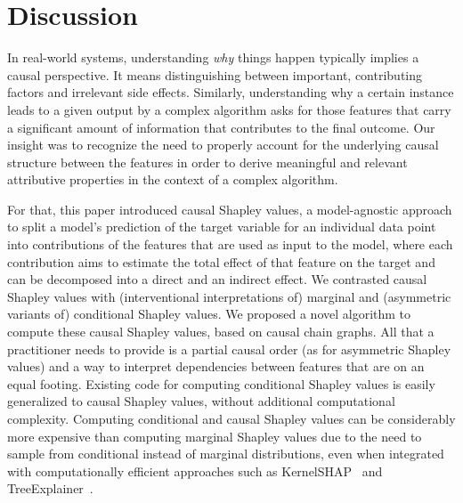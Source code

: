 \documentclass{article}
\newcommand{\comment}[1]{{\color{red} #1}}
\begin{document}
\section{Discussion}

In real-world systems, understanding {\em why} things happen typically implies a causal perspective. It means distinguishing between important, contributing factors and irrelevant side effects. Similarly, understanding why a certain instance leads to a given output by a complex algorithm asks for those features that carry a significant amount of information that contributes to the final outcome. Our insight was to recognize the need to properly account for the underlying causal structure between the features in order to derive meaningful and relevant attributive properties in the context of a complex algorithm.

For that, this paper introduced causal Shapley values, a model-agnostic approach to split a model's prediction of the target variable for an individual data point into contributions of the features that are used as input to the model, where each contribution aims to estimate the total effect of that feature on the target and can be decomposed into a direct and an indirect effect. We contrasted causal Shapley values with (interventional interpretations of) marginal and (asymmetric variants of) conditional Shapley values.
We proposed a novel algorithm to compute these causal Shapley values, based on causal chain graphs. All that a practitioner needs to provide is a partial causal order (as for asymmetric Shapley values) and a way to interpret dependencies between features that are on an equal footing.
Existing code for computing conditional Shapley values is easily generalized to causal Shapley values, without additional computational complexity. Computing conditional and causal Shapley values can be considerably more expensive than computing marginal Shapley values due to the need to sample from conditional instead of marginal distributions, even when integrated with computationally efficient approaches such as KernelSHAP~\cite{lundberg2017unified} and TreeExplainer~\cite{lundberg2020local}.
\end{document}
